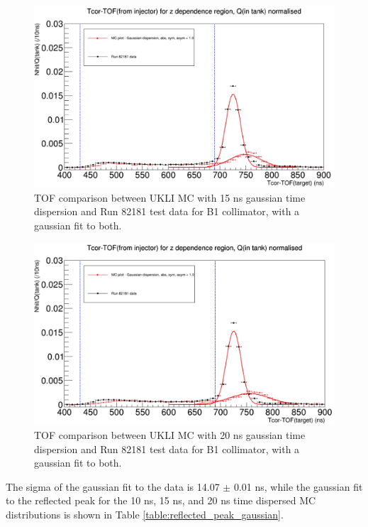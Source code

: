 \begin{figure}
    \centering
    \includegraphics[width=\textwidth]{Figures/Inked15ns_gaussian_dispersion_with_fit.jpg}
    \caption{TOF comparison between UKLI MC with 15 ns gaussian time dispersion and Run 82181 test data for B1 collimator, with a gaussian fit to both.}
    \label{fig:15ns_time_dispersion}
\end{figure}

\begin{figure}
    \centering
    \includegraphics[width=\textwidth]{Figures/Inked20ns_gaussian_dispersion_with_fit.jpg}
    \caption{TOF comparison between UKLI MC with 20 ns gaussian time dispersion and Run 82181 test data for B1 collimator, with a gaussian fit to both.}
    \label{fig:20ns_time_dispersion}
\end{figure}


The sigma of the gaussian fit to the data is 14.07 $\pm$ 0.01 ns, while the gaussian fit to the reflected peak for the 10 ns, 15 ns, and 20 ns time dispersed MC distributions is shown in Table \ref{table:reflected_peak_gaussian}. 

